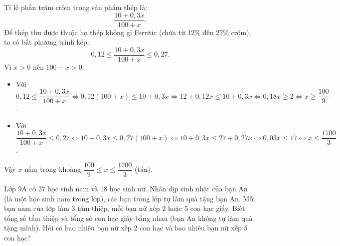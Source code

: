 \begin{bt}
{\begin{enumerate}[a)]
	Tỉ lệ phần trăm crôm trong sản phẩm thép là:
	$$\dfrac{10 + 0{,}3x}{100 + x}.$$
	Để thép thu được thuộc họ thép không gỉ Ferritic (chứa từ $12\%$ đến $27\%$ crôm), ta có bất phương trình kép:
	$$0{,}12 \le \dfrac{10 + 0{,}3x}{100 + x} \le 0{,}27.$$
	Vì $x > 0$ nên $100 + x > 0$:
	\begin{itemize}
		\item Với $0{,}12 \le \dfrac{10 + 0{,}3x}{100 + x} \iff 0{,}12(100 + x) \le 10 + 0{,}3x \iff 12 + 0{,}12x \le 10 + 0{,}3x \iff 0{,}18x \ge 2 \iff x \ge \dfrac{100}{9}$.
		\item Với $\dfrac{10 + 0{,}3x}{100 + x} \le 0{,}27 \iff 10 + 0{,}3x \le 0{,}27(100 + x) \iff 10 + 0{,}3x \le 27 + 0{,}27x \iff 0{,}03x \le 17 \iff x \le \dfrac{1700}{3}$.
	\end{itemize}
	Vậy $x$ nằm trong khoảng $\dfrac{100}{9} \le x \le \dfrac{1700}{3}$ (tấn).
\end{enumerate}
}
\end{bt}

\begin{bt}%
Lớp 9A có $27$ học sinh nam và $18$ học sinh nữ. Nhân dịp sinh nhật của bạn An (là một học sinh nam trong lớp), các bạn trong lớp tự làm quà tặng bạn An. Mỗi bạn nam của lớp làm $3$ tấm thiệp, mỗi bạn nữ xếp $2$ hoặc $5$ con hạc giấy. Biết tổng số tấm thiệp và tổng số con hạc giấy bằng nhau (bạn An không tự làm quà tặng mình). Hỏi có bao nhiêu bạn nữ xếp $2$ con hạc và bao nhiêu bạn nữ xếp $5$ con hạc?
\end{bt}

